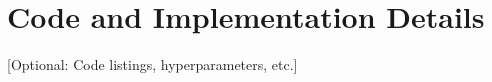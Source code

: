 \chapter{Code and Implementation Details}
\label{app:code}

[Optional: Code listings, hyperparameters, etc.]
